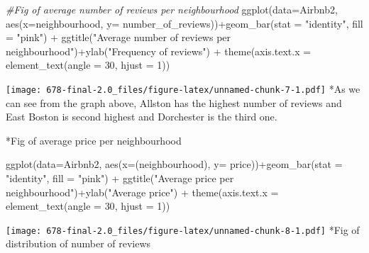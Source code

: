\documentclass[
]{article}
\newenvironment{Shaded}{\begin{snugshade}}{\end{snugshade}}
\newcommand{\AttributeTok}[1]{\textcolor[rgb]{0.77,0.63,0.00}{#1}}
\newcommand{\CommentTok}[1]{\textcolor[rgb]{0.56,0.35,0.01}{\textit{#1}}}
\newcommand{\DecValTok}[1]{\textcolor[rgb]{0.00,0.00,0.81}{#1}}
\newcommand{\FunctionTok}[1]{\textcolor[rgb]{0.00,0.00,0.00}{#1}}
\newcommand{\NormalTok}[1]{#1}
\newcommand{\SpecialCharTok}[1]{\textcolor[rgb]{0.00,0.00,0.00}{#1}}
\newcommand{\StringTok}[1]{\textcolor[rgb]{0.31,0.60,0.02}{#1}}
\begin{document}
\begin{Shaded}
\begin{Highlighting}[]
\CommentTok{\#Fig of average number of reviews per neighbourhood}
\FunctionTok{ggplot}\NormalTok{(}\AttributeTok{data=}\NormalTok{Airbnb2, }\FunctionTok{aes}\NormalTok{(}\AttributeTok{x=}\NormalTok{neighbourhood, }\AttributeTok{y=}\NormalTok{ number\_of\_reviews))}\SpecialCharTok{+}\FunctionTok{geom\_bar}\NormalTok{(}\AttributeTok{stat =} \StringTok{"identity"}\NormalTok{,  }\AttributeTok{fill =} \StringTok{"pink"}\NormalTok{) }\SpecialCharTok{+} \FunctionTok{ggtitle}\NormalTok{(}\StringTok{"Average number of reviews per neighbourhood"}\NormalTok{)}\SpecialCharTok{+}\FunctionTok{ylab}\NormalTok{(}\StringTok{"Frequency of reviews"}\NormalTok{) }\SpecialCharTok{+} \FunctionTok{theme}\NormalTok{(}\AttributeTok{axis.text.x =} \FunctionTok{element\_text}\NormalTok{(}\AttributeTok{angle =} \DecValTok{30}\NormalTok{, }\AttributeTok{hjust =} \DecValTok{1}\NormalTok{))}
\end{Highlighting}
\end{Shaded}

\texttt{[image: 678-final-2.0\_files/figure-latex/unnamed-chunk-7-1.pdf]}
*As we can see from the graph above, Allston has the highest number of
reviews and East Boston is second highest and Dorchester is the third
one.

*Fig of average price per neighbourhood

\begin{Shaded}
\begin{Highlighting}[]
\FunctionTok{ggplot}\NormalTok{(}\AttributeTok{data=}\NormalTok{Airbnb2, }\FunctionTok{aes}\NormalTok{(}\AttributeTok{x=}\NormalTok{(neighbourhood), }\AttributeTok{y=}\NormalTok{ price))}\SpecialCharTok{+}\FunctionTok{geom\_bar}\NormalTok{(}\AttributeTok{stat =} \StringTok{"identity"}\NormalTok{,  }\AttributeTok{fill =} \StringTok{"pink"}\NormalTok{) }\SpecialCharTok{+} \FunctionTok{ggtitle}\NormalTok{(}\StringTok{"Average price per neighbourhood"}\NormalTok{)}\SpecialCharTok{+}\FunctionTok{ylab}\NormalTok{(}\StringTok{"Average price"}\NormalTok{) }\SpecialCharTok{+} \FunctionTok{theme}\NormalTok{(}\AttributeTok{axis.text.x =} \FunctionTok{element\_text}\NormalTok{(}\AttributeTok{angle =} \DecValTok{30}\NormalTok{, }\AttributeTok{hjust =} \DecValTok{1}\NormalTok{))}
\end{Highlighting}
\end{Shaded}

\texttt{[image: 678-final-2.0\_files/figure-latex/unnamed-chunk-8-1.pdf]}
*Fig of distribution of number of reviews
\end{document}
